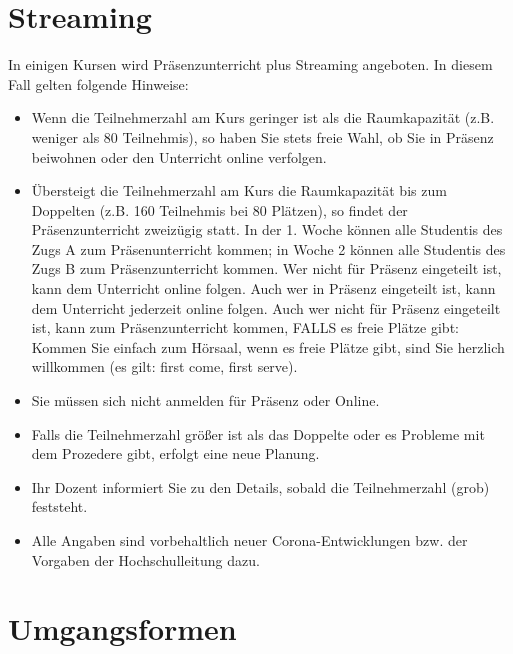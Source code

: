 \documentclass[
  a4paper,
  DIV=11]{scrreprt}
\providecommand{\tightlist}{%
  \setlength{\itemsep}{0pt}\setlength{\parskip}{0pt}}\usepackage{longtable,booktabs,array}
\theoremstyle{definition}
\theoremstyle{definition}
\theoremstyle{remark}
\begin{document}
\hypertarget{streaming}{%
\section*{Streaming}\label{streaming}}


In einigen Kursen wird Präsenzunterricht plus Streaming angeboten. In
diesem Fall gelten folgende Hinweise:

\begin{itemize}
\tightlist
\item
  Wenn die Teilnehmerzahl am Kurs geringer ist als die Raumkapazität
  (z.B. weniger als 80 Teilnehmis), so haben Sie stets freie Wahl, ob
  Sie in Präsenz beiwohnen oder den Unterricht online verfolgen.
\item
  Übersteigt die Teilnehmerzahl am Kurs die Raumkapazität bis zum
  Doppelten (z.B. 160 Teilnehmis bei 80 Plätzen), so findet der
  Präsenzunterricht zweizügig statt. In der 1. Woche können alle
  Studentis des Zugs A zum Präsenunterricht kommen; in Woche 2 können
  alle Studentis des Zugs B zum Präsenzunterricht kommen. Wer nicht für
  Präsenz eingeteilt ist, kann dem Unterricht online folgen. Auch wer in
  Präsenz eingeteilt ist, kann dem Unterricht jederzeit online folgen.
  Auch wer nicht für Präsenz eingeteilt ist, kann zum Präsenzunterricht
  kommen, FALLS es freie Plätze gibt: Kommen Sie einfach zum Hörsaal,
  wenn es freie Plätze gibt, sind Sie herzlich willkommen (es gilt:
  first come, first serve).
\item
  Sie müssen sich nicht anmelden für Präsenz oder Online.
\item
  Falls die Teilnehmerzahl größer ist als das Doppelte oder es Probleme
  mit dem Prozedere gibt, erfolgt eine neue Planung.
\item
  Ihr Dozent informiert Sie zu den Details, sobald die Teilnehmerzahl
  (grob) feststeht.
\item
  Alle Angaben sind vorbehaltlich neuer Corona-Entwicklungen bzw. der
  Vorgaben der Hochschulleitung dazu.
\end{itemize}

\hypertarget{umgangsformen}{%
\section*{Umgangsformen}\label{umgangsformen}}

\end{document}
